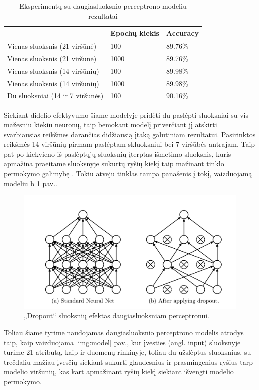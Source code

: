 \documentclass{VUMIFPSbakalaurinis}
\begin{document}
\begin{table}[H]
\centering
\caption{Eksperimentų su daugiasluoksnio perceptrono modeliu rezultatai}
\label{tab:MLP_experiment}
\begin{tabular}{|lll|}
\hline
 & Epochų kiekis & Accuracy \\ \hline
Vienas sluoksnis (21 viršūnė) & 100 & 89.76\% \\
Vienas sluoksnis (21 viršūnė) & 1000 & 89.76\% \\
Vienas sluoksnis (14 viršūnių) & 100 & 89.98\% \\
Vienas sluoksnis (14 viršūnių) & 1000 & 89.98\% \\
Du sluoksniai (14 ir 7 viršūnės) & 100 & 90.16\% \\ \hline
\end{tabular}
\end{table}

Siekiant didelio efektyvumo šiame modelyje pridėti du paslėpti sluoksniai su vis mažesniu kiekiu neuronų, taip bemokant modelį priverčiant jį atskirti svarbiausias reikšmes darančias didžiausią įtaką galutiniam rezultatui. Pasirinktos reikšmės 14 viršūnių pirmam paslėptam skluoksniui bei 7 viršūbės antrajam. Taip pat po kiekvieno iš paslėptųjų sluoksnių įterptas išmetimo sluoksnis, kuris apmažina praeitame sluoksnyje sukurtų ryšių kiekį taip mažinant tinklo permokymo galimybę \cite{JMLR:v15:srivastava14a}. Tokiu atveju tinklas tampa panašenis į tokį, vaizduojamą modeliu b \ref{img:dropout} pav..

\begin{figure}[H]
    \centering
    \includegraphics[scale=0.5]{img/dropout}
    \caption{„Dropout“ sluoksnių efektas daugiasluoksniam perceptronui.}
    \label{img:dropout}
\end{figure}

Toliau šiame tyrime naudojamas daugiasluoksnio perceptrono modelis atrodys taip, kaip vaizduojama \ref{img:model} pav., kur įvesties (angl. input) sluoksnyje turime 21 atributą, kaip ir duomenų rinkinyje, toliau du užslėptus sluoksnius, su trečdaliu mažiau įvesčių siekiant sukurti glaudesnius ir prasmingenius ryšius tarp modelio viršūnių, kas kart apmažinant ryšių kiekį siekiant išvengti modelio permokymo.
\end{document}
